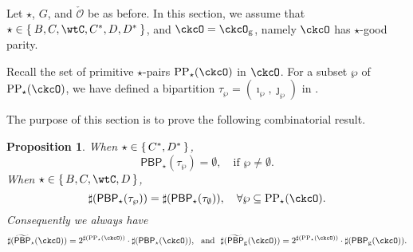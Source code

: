 \documentclass[12pt,a4paper]{amsart}
\newcommand{\CO}{{\mathcal {O}}}
\numberwithin{equation}{section}
\newtheorem{prop}[thm]{Proposition}
\theoremstyle{remark}
\def\CPPs{\mathrm{PP}_{\star}}
\def\tPBP{\widetilde{\mathsf{PBP}}}
\def\PBP{\mathsf{PBP}}
\def\ckcOg{\ckcO_{\mathrm g}}
\def\tPBP{\widetilde{\mathsf{PBP}}}
\begin{document}
Let $\star$, $G$, and $\check \CO$ be as before. In this section, we assume that $\star \in \Set{B,C,\wtC,C^{*},D,D^{*}}$, and $\ckcO = \ckcOg$, namely $\ckcO $ has $\star$-good parity.

Recall the set of primitive $\star$-pairs $\CPPs(\ckcO)$ in $\ckcO$. For a subset $\wp$ of $\CPPs(\ckcO)$, we have defined a bipartition $\tau_{\wp}=(\imath_{\wp},\jmath_{\wp})$ in .

The purpose of this section is to prove the   following combinatorial result. 

\begin{prop} \label{prop:PBP} When $\star\in \set{C^{*}, D^{*}}$,
  \[
    \PBP_{\star}(\tau_{\wp}) = \emptyset, \quad \text{if } \wp \neq \emptyset.
  \]
  When $\star\in \set{B,C,\wtC,D}$,
  \[
    \sharp(\PBP_{\star}(\tau_{\wp})) = \sharp(\PBP_{\star}(\tau_{\emptyset})), \quad \forall \wp \subseteq \CPPs(\ckcO).
  \]
 Consequently we always have
  \[
    \sharp(\tPBP_{\star}(\ckcO)) = 2^{\sharp(\CPPs(\ckcO))}\cdot \sharp(\PBP_{\star}(\ckcO)), \,\, \text{ and } \,\, \sharp(\tPBP_{\mathrm g}(\ckcO)) = 2^{\sharp(\CPPs(\ckcO))}\cdot \sharp(\PBP_{\mathrm g}(\ckcO)).
  \]
\end{prop}

\end{document}
